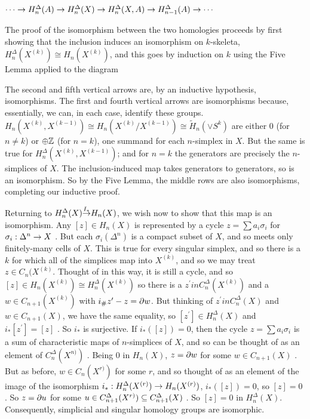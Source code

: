 \ssk

$\cdots \rightarrow H_n^\Delta(A) \rightarrow H_n^\Delta(X) \rightarrow H_n^\Delta(X,A) \rightarrow H_{n-1}^\Delta(A) \rightarrow \cdots$

\ssk

The proof of the isomorphism between the two homologies proceeds by first showing that the
inclusion induces an isomorphism on $k$-skeleta, $H_n^\Delta(X^{(k)})\cong H_n(X^{(k)})$,
and this goes by induction on $k$ using the Five Lemma applied to the diagram

\ssk


\ssk

The second and fifth vertical arrows are, by an inductive hypothesis, isomorphisms. The first and fourth vertical arrows are
isomorphisms because, essentially, we can, in each case, identify these groups. 
$H_{n}(X^{(k)},X^{(k-1)})\cong H_{n}(X^{(k)}/X^{(k-1)})\cong \widetilde{H}_n(\vee S^k)$
are either 0 (for $n\neq k$) or $\oplus {\Bbb Z}$ (for $n=k$), one summand for each $n$-simplex in $X$. 
But the same is true for $H_{n}^\Delta(X^{(k)},X^{(k-1)})$; and for $n=k$ the generators are precisely
the $n$-simplices of $X$. The inclusion-induced map takes generators to generators, so is an isomorphism.
\hhsk So by the Five Lemma, the middle rows are also isomorphisms, completing our inductive proof.

\ssk

Returning to $H_n^\Delta(X) {\buildrel {I_*}\over \ra} H_n(X)$, we wish now to show that this map is an isomorphism.
Any $[z]\in H_n(X)$ is represented by a cycle $z=\sum a_i\sigma_i$ for $\sigma_i:\Delta^n\rightarrow X$ . But each
$\sigma_i(\Delta^n)$ is a compact subset of $X$, and so meets only finitely-many cells of $X$. This is true for every
singular simplex, and so there is a $k$ for which all of the simplices map into $X^{(k)}$, and so we may
treat $z\in C_n(X^{(k)}$. Thought of in this way, it is still a cycle, and so $[z]\in H_n(X^{(k)})\cong H_n^\Delta(X^{(k)})$
so there is a $z^\prime in C_n^\Delta(X^{(k)})$ and a $w\in C_{n+1}(X^{(k)})$ with $i_\#z^\prime -z=\partial w$. 
But thinking of  $z^\prime in C_n^\Delta(X)$ and $w\in C_{n+1}(X)$, we have the same equality, so 
$[z^\prime] \in H_n^\Delta(X)$ and $i_*[z^\prime] = [z]$ . So $i_*$ is surjective.
If $i_*([z]) = 0$, then the cycle $z=\sum a_i\sigma_i$ is a sum of characteristic maps of $n$-simplices of $X$, and
so can be thought of as an element of $C_n^\Delta(X^{n)})$ . Being $0$ in $H_n(X)$, $z=\partial w$ for some
$w\in C_{n+1}(X)$ . But as before, $w\in C_n(X^{r)})$ for some $r$, and so thought of as an element of 
the image of the isomorphism $i_*: H_n^\Delta(X^{(r)})\rightarrow H_n(X^{(r)})$, $i_*([z])=0$, so $[z]=0$ . So 
$z=\partial u$ for some $u\in C_{n+1}^\Delta(X^{r)})\subseteq C_{n+1}^\Delta(X)$ . So $[z]=0$ in $H_n^\Delta(X)$.
Consequently, simplicial and singular homology groups are isomorphic.

